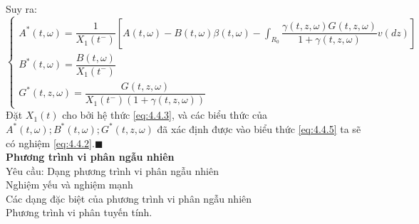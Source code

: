 \documentclass[14pt,a4paper]{article}
\numberwithin{equation}{section}
\begin{document}
Suy ra:
\begin{equation*}
	\begin{cases}
		A^*(t,\omega)=\dfrac{1}{X_1(t^-)}\left[A(t,\omega)-B(t,\omega)\beta(t,\omega)-\int_{R_0}\dfrac{\gamma(t,z,\omega)G(t,z,\omega)}{1+\gamma(t,z,\omega)}v(dz) \right]\\
		B^*(t,\omega)=\dfrac{B(t,\omega)}{X_1(t^-)}\\
		G^*(t,z,\omega)=\dfrac{G(t,z,\omega)}{X_1(t^-)(1+\gamma(t,z,\omega))}
	\end{cases}
\end{equation*}
Đặt $X_1(t)$ cho bởi hệ thức \eqref{eq:4.4.3}, và các biểu thức của $A^*(t,\omega);B^*(t,\omega);G^*(t,z,\omega)$ đã xác định được vào biểu thức \eqref{eq:4.4.5} ta sẽ có nghiệm \eqref{eq:4.4.2}.$\blacksquare$\\

\textbf{Phương trình vi phân ngẫu nhiên}\\
Yêu cầu: Dạng phương trình vi phân ngẫu nhiên\\
Nghiệm yếu và nghiệm mạnh\\
Các dạng đặc biệt của phương trình vi phân ngẫu nhiên\\
Phương trình vi phân tuyến tính.\\
\end{document}
